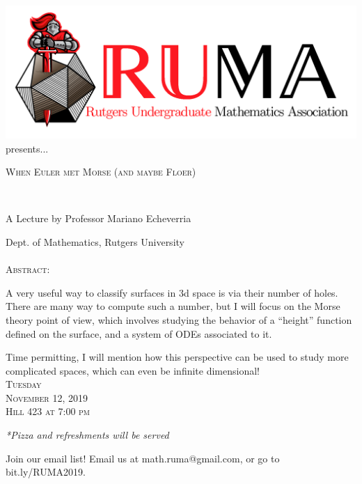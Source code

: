 \documentclass[12pt]{article}
\begin{document}

\begin{center}\includegraphics[scale=.45]{RUMAlogo.png}\\
presents... \\
\begin{spacing}{1}
{\fontsize{40}{44}\selectfont  \textsc{
When Euler met Morse (and maybe Floer)}} \end{spacing}
 

~~\\
\begin{spacing}{1.5}
{\fontsize{24}{24} \selectfont A Lecture by Professor Mariano
  Echeverria}  \end{spacing} 
\large Dept. of Mathematics, Rutgers University \\~~\\

\normalsize
\textsc{Abstract:}

\Large
A very useful way to classify surfaces in 3d space
is via their number of holes. There are many
way to compute such a number, but I will focus
on the Morse theory point of view, which involves studying
the behavior of a ``height'' function defined on the surface,
and a system of ODEs associated to it.

Time permitting, I will mention how this perspective can
be used to study more complicated spaces, which can even
be infinite dimensional! 
\\

\vspace{10mm} 
\Huge   \textsc{Tuesday\\November 12, 2019 \\Hill 423 at 7:00
  pm}

\vspace{2mm}
\large
\emph{*Pizza and refreshments will be served}
\end{center}

\begin{center}
  \large  Join our email list! Email us at math.ruma@gmail.com, or
go to bit.ly/RUMA2019.\\
\end{center}
\end{document}
